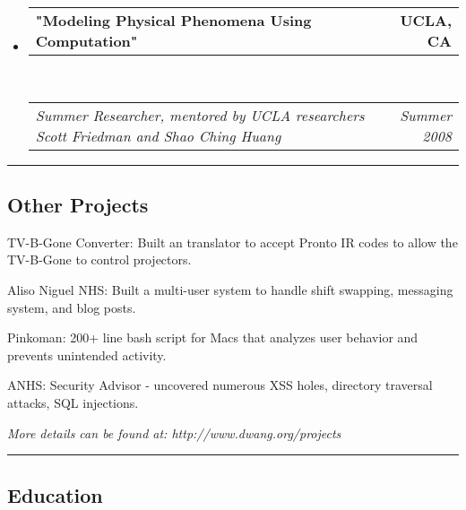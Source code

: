 \documentclass[10pt,letterpaper]{article}
\makeatletter
\newenvironment{indentsection}[1]%
{\begin{list}{}%
	{\setlength{\leftmargin}{#1}}%
	\item[]%
}
{\end{list}}
\newcommand{\headerrow}[2]
{\begin{tabular*}{\linewidth}{l@{\extracolsep{\fill}}r}
	#1 &
	#2 \\
\end{tabular*}}
\makeatother
\begin{document}
\begin{itemize}
	\item
	\headerrow
		{\textbf{"Modeling Physical Phenomena Using Computation"}}
		{\textbf{UCLA, CA}}
	\\
	\headerrow
		{\emph{Summer Researcher, mentored by UCLA researchers Scott Friedman and Shao Ching Huang }}
		{\emph{Summer 2008}}

\end{itemize}


\hrule
\vspace{-0.4em}
\subsection*{Other Projects}

\begin{indentsection}{\parindent}
\begin{description*}
	\item[TV-B-Gone Converter:] Built an translator to accept Pronto IR codes to allow the TV-B-Gone to control projectors.
	\item[Aliso Niguel NHS:] Built a multi-user system to handle shift swapping, messaging system, and blog posts.
	\item[Pinkoman:] 200+ line bash script for Macs that analyzes user behavior and prevents unintended activity.
	\item[ANHS:] Security Advisor - uncovered numerous XSS holes, directory traversal attacks, SQL injections.
\end{description*}
\textit{More details can be found at: http://www.dwang.org/projects} 
\end{indentsection}


\hrule
\vspace{-0.4em}
\subsection*{Education}
\end{document}
